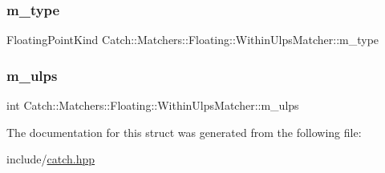 \subsubsection{\texorpdfstring{m\_type}{m\_type}}
{\footnotesize\ttfamily Floating\+Point\+Kind Catch\+::\+Matchers\+::\+Floating\+::\+Within\+Ulps\+Matcher\+::m\+\_\+type\hspace{0.3cm}{\ttfamily [private]}}

\mbox{\label{struct_catch_1_1_matchers_1_1_floating_1_1_within_ulps_matcher_aa117ee9be2778cdfb3ad5e66e94de1b3}} 
\subsubsection{\texorpdfstring{m\_ulps}{m\_ulps}}
{\footnotesize\ttfamily int Catch\+::\+Matchers\+::\+Floating\+::\+Within\+Ulps\+Matcher\+::m\+\_\+ulps\hspace{0.3cm}{\ttfamily [private]}}



The documentation for this struct was generated from the following file\+:\begin{DoxyCompactItemize}
\item 
include/\mbox{\hyperlink{catch_8hpp}{catch.\+hpp}}\end{DoxyCompactItemize}
